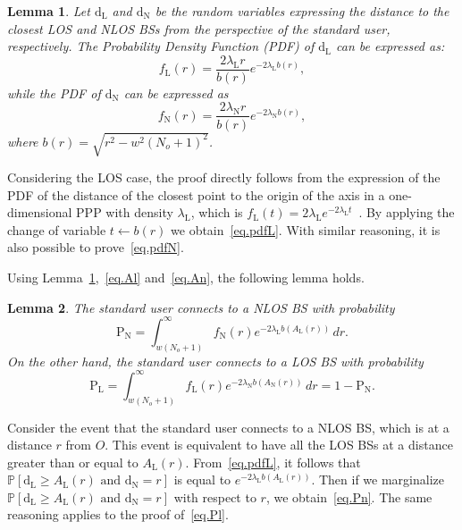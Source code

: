 \documentclass[10pt,journal,a4paper]{IEEEtran}
\newtheorem{lemma}{Lemma}[section]
\begin{document}
\begin{lemma}\label{lem.pdf}
Let $\mathrm{d}_{\mathrm{L}}$ and $\mathrm{d}_{\mathrm{N}}$ be the random variables expressing the distance to the closest LOS and NLOS BSs from the perspective of the standard user, respectively. The Probability Density Function (PDF) of $\mathrm{d}_{\mathrm{L}}$ can be expressed as:
\begin{equation}
f_\mathrm{L}(r) = \frac{2 \lambda_{\mathrm{L}} r}{b(r)} e^{-2 \lambda_{\mathrm{L}} b(r)}, \label{eq.pdfL}
\end{equation}
while the PDF of $\mathrm{d}_{\mathrm{N}}$ can be expressed as
\begin{equation}
f_\mathrm{N}(r) = \frac{2 \lambda_{\mathrm{N}} r}{b(r)} e^{-2 \lambda_{\mathrm{N}} b(r)}, \label{eq.pdfN}
\end{equation}
where $b(r) = \sqrt{r^2 - w^2(N_o+1)^2}$.
\end{lemma}
\begin{IEEEproof}
Considering the LOS case, the proof directly follows from the expression of the PDF of the distance of the closest point to the origin of the axis in a one-dimensional PPP with density $\lambda_{\mathrm{L}}$, which is $f_\mathrm{L}(t) = 2 \lambda_{\mathrm{L}} e^{-2 \lambda_{\mathrm{L}} t}$~\cite[Eq.~(2.12)]{haenggi2013stochastic}. By applying the change of variable $t \leftarrow b(r)$ we obtain~\eqref{eq.pdfL}. With similar reasoning, it is also possible to prove~\eqref{eq.pdfN}.
\end{IEEEproof}

Using Lemma~\ref{lem.pdf},~\eqref{eq.Al} and~\eqref{eq.An}, the following lemma holds.
\begin{lemma}\label{lem.serv}
The standard user connects to a NLOS BS with probability
\begin{equation}
\mathrm{P}_{\mathrm{N}} = \int_{w(N_o+1)}^{\infty} f_\mathrm{N}(r) e^{-2 \lambda_{\mathrm{L}} b\left(A_{\mathrm{L}}(r)\right)} \,dr. \label{eq.Pn}
\end{equation}
On the other hand, the standard user connects to a LOS BS with probability
\begin{equation}
\mathrm{P}_{\mathrm{L}} = \int_{w(N_o+1)}^{\infty} f_\mathrm{L}(r) e^{-2 \lambda_{\mathrm{N}} b\left(A_{\mathrm{N}}(r)\right)} \,dr = 1 - \mathrm{P}_{\mathrm{N}}. \label{eq.Pl}
\end{equation}
\end{lemma}
\begin{IEEEproof}
Consider the event that the standard user connects to a NLOS BS, which is at a distance $r$ from $O$. This event is equivalent to have all the LOS BSs at a distance greater than or equal to $A_{\mathrm{L}}(r)$. From~\eqref{eq.pdfL}, it follows that $\mathbb{P}[\mathrm{d}_{\mathrm{L}} \geq A_{\mathrm{L}}(r) \,\,\text{and}\,\, \mathrm{d}_{\mathrm{N}} = r]$ is equal to $e^{-2 \lambda_{\mathrm{L}} b\left(A_{\mathrm{L}}(r)\right)}$. Then if we marginalize $\mathbb{P}[\mathrm{d}_{\mathrm{L}} \geq A_{\mathrm{L}}(r) \,\,\text{and}\,\, \mathrm{d}_{\mathrm{N}} = r]$ with respect to $r$, we obtain~\eqref{eq.Pn}. The same reasoning applies to the proof of~\eqref{eq.Pl}.
\end{IEEEproof}
\end{document}
